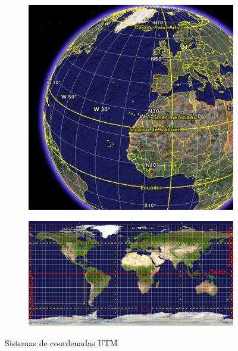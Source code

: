 \begin{figure}[H]
	\centering
	\begin{subfigure}[h]{0.33\textwidth} 
		\includegraphics[width=\textwidth]{imagenes/capitulo2/2_utm1.jpg}
		\caption{}
	\end{subfigure}       
	\begin{subfigure}[h]{0.636\textwidth} 
		\includegraphics[width=\textwidth]{imagenes/capitulo2/2_utm2.png}
		\caption{}
	\end{subfigure}
	\caption{Sistemas de coordenadas UTM \cite{utm-nuevo}}
	\label{fig:UTM}
\end{figure}


